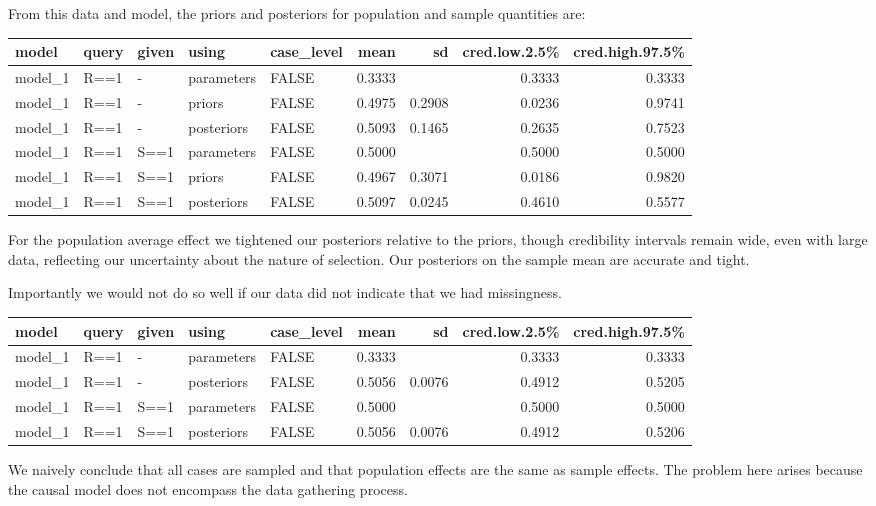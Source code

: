 \documentclass[
  12pt,
]{book}
\begin{document}
From this data and model, the priors and posteriors for population and sample quantities are:

\begin{tabular}{l|l|l|l|l|r|r|r|r}
\hline
model & query & given & using & case\_level & mean & sd & cred.low.2.5\% & cred.high.97.5\%\\
\hline
model\_1 & R==1 & - & parameters & FALSE & 0.3333 &  & 0.3333 & 0.3333\\
\hline
model\_1 & R==1 & - & priors & FALSE & 0.4975 & 0.2908 & 0.0236 & 0.9741\\
\hline
model\_1 & R==1 & - & posteriors & FALSE & 0.5093 & 0.1465 & 0.2635 & 0.7523\\
\hline
model\_1 & R==1 & S==1 & parameters & FALSE & 0.5000 &  & 0.5000 & 0.5000\\
\hline
model\_1 & R==1 & S==1 & priors & FALSE & 0.4967 & 0.3071 & 0.0186 & 0.9820\\
\hline
model\_1 & R==1 & S==1 & posteriors & FALSE & 0.5097 & 0.0245 & 0.4610 & 0.5577\\
\hline
\end{tabular}

For the population average effect we tightened our posteriors relative to the priors, though credibility intervals remain wide, even with large data, reflecting our uncertainty about the nature of selection. Our posteriors on the sample mean are accurate and tight.

Importantly we would not do so well if our data did not indicate that we had missingness.

\begin{tabular}{l|l|l|l|l|r|r|r|r}
\hline
model & query & given & using & case\_level & mean & sd & cred.low.2.5\% & cred.high.97.5\%\\
\hline
model\_1 & R==1 & - & parameters & FALSE & 0.3333 &  & 0.3333 & 0.3333\\
\hline
model\_1 & R==1 & - & posteriors & FALSE & 0.5056 & 0.0076 & 0.4912 & 0.5205\\
\hline
model\_1 & R==1 & S==1 & parameters & FALSE & 0.5000 &  & 0.5000 & 0.5000\\
\hline
model\_1 & R==1 & S==1 & posteriors & FALSE & 0.5056 & 0.0076 & 0.4912 & 0.5206\\
\hline
\end{tabular}

We naively conclude that all cases are sampled and that population effects are the same as sample effects. The problem here arises because the causal model does not encompass the data gathering process.
\end{document}
